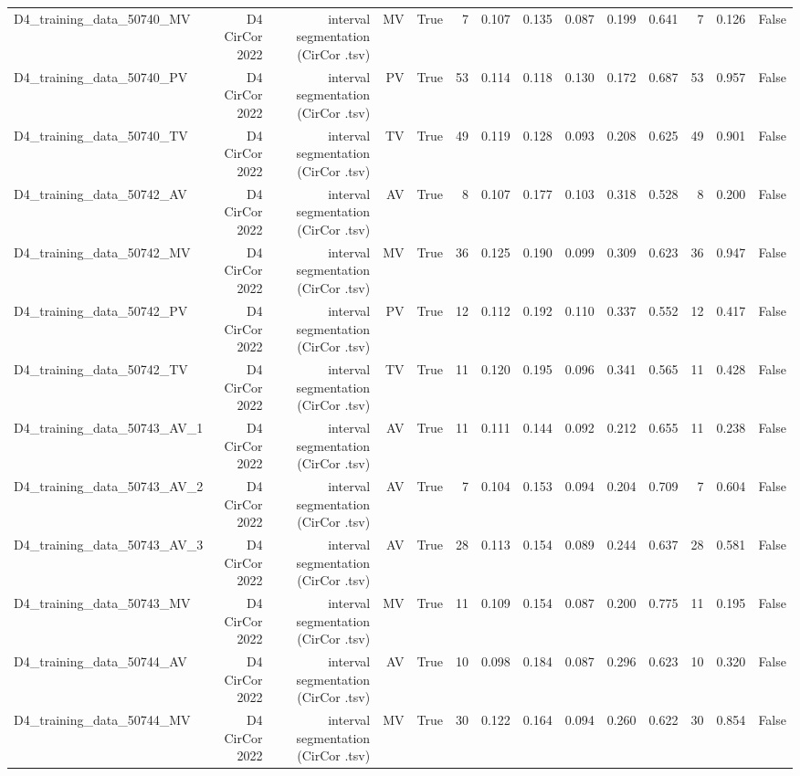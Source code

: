 \begin{table}[htbp]
\begin{tabular}{lrrrrrrrrrrrrr}
    D4\_training\_data\_50740\_MV & D4 CirCor 2022 & interval segmentation (CirCor .tsv) & MV & True & 7 & 0.107 & 0.135 & 0.087 & 0.199 & 0.641 & 7 & 0.126 & False \\
    D4\_training\_data\_50740\_PV & D4 CirCor 2022 & interval segmentation (CirCor .tsv) & PV & True & 53 & 0.114 & 0.118 & 0.130 & 0.172 & 0.687 & 53 & 0.957 & False \\
    D4\_training\_data\_50740\_TV & D4 CirCor 2022 & interval segmentation (CirCor .tsv) & TV & True & 49 & 0.119 & 0.128 & 0.093 & 0.208 & 0.625 & 49 & 0.901 & False \\
    D4\_training\_data\_50742\_AV & D4 CirCor 2022 & interval segmentation (CirCor .tsv) & AV & True & 8 & 0.107 & 0.177 & 0.103 & 0.318 & 0.528 & 8 & 0.200 & False \\
    D4\_training\_data\_50742\_MV & D4 CirCor 2022 & interval segmentation (CirCor .tsv) & MV & True & 36 & 0.125 & 0.190 & 0.099 & 0.309 & 0.623 & 36 & 0.947 & False \\
    D4\_training\_data\_50742\_PV & D4 CirCor 2022 & interval segmentation (CirCor .tsv) & PV & True & 12 & 0.112 & 0.192 & 0.110 & 0.337 & 0.552 & 12 & 0.417 & False \\
    D4\_training\_data\_50742\_TV & D4 CirCor 2022 & interval segmentation (CirCor .tsv) & TV & True & 11 & 0.120 & 0.195 & 0.096 & 0.341 & 0.565 & 11 & 0.428 & False \\
    D4\_training\_data\_50743\_AV\_1 & D4 CirCor 2022 & interval segmentation (CirCor .tsv) & AV & True & 11 & 0.111 & 0.144 & 0.092 & 0.212 & 0.655 & 11 & 0.238 & False \\
    D4\_training\_data\_50743\_AV\_2 & D4 CirCor 2022 & interval segmentation (CirCor .tsv) & AV & True & 7 & 0.104 & 0.153 & 0.094 & 0.204 & 0.709 & 7 & 0.604 & False \\
    D4\_training\_data\_50743\_AV\_3 & D4 CirCor 2022 & interval segmentation (CirCor .tsv) & AV & True & 28 & 0.113 & 0.154 & 0.089 & 0.244 & 0.637 & 28 & 0.581 & False \\
    D4\_training\_data\_50743\_MV & D4 CirCor 2022 & interval segmentation (CirCor .tsv) & MV & True & 11 & 0.109 & 0.154 & 0.087 & 0.200 & 0.775 & 11 & 0.195 & False \\
    D4\_training\_data\_50744\_AV & D4 CirCor 2022 & interval segmentation (CirCor .tsv) & AV & True & 10 & 0.098 & 0.184 & 0.087 & 0.296 & 0.623 & 10 & 0.320 & False \\
    D4\_training\_data\_50744\_MV & D4 CirCor 2022 & interval segmentation (CirCor .tsv) & MV & True & 30 & 0.122 & 0.164 & 0.094 & 0.260 & 0.622 & 30 & 0.854 & False \\

\end{tabular}
\end{table}
